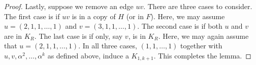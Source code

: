 \documentclass[12pt]{amsart}
\theoremstyle{plain}
\theoremstyle{definition}
\theoremstyle{remark}
\begin{document}
\begin{proof}
Lastly, suppose we remove an edge $uv$.  There are three cases to consider.  The first case is if $uv$ is in a copy of $H$ (or in $F$).  Here, we may assume $u = (2,1,1,\dots,1)$ and $v = (3,1,1,\dots,1)$.  The second case is if both $u$ and $v$ are in $K_R$.  The last case is if only, say $v$, is in $K_R$.  Here, we may again assume that $u = (2,1,1,\dots,1)$.  In all three cases, $(1,1,\dots,1)$ together with $u,v,\alpha^2,\dots,\alpha^k$ as defined above, induce a $K_{1,k+1}$.  This completes the lemma.
\end{proof}

\end{document}
